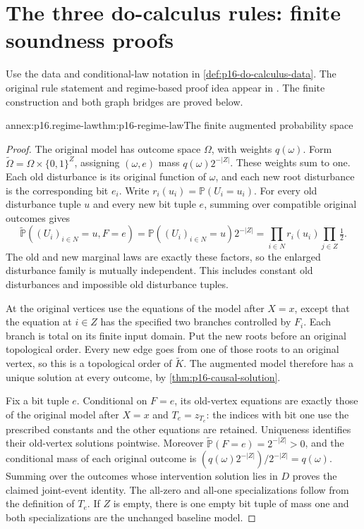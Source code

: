 \section{The three do-calculus rules: finite soundness proofs}
\label{sec:annex-p16-do-calculus-soundness}

Use the data and conditional-law notation in
\cref{def:p16-do-calculus-data}. The original rule statement and
regime-based proof idea appear in
\cite[Theorem~3 and Appendix, pp.~677, 686--687]{Pearl1995CausalDiagrams}.
The finite construction and both graph bridges are proved below.

\begin{annexitem}{annex:p16.regime-law}{thm:p16-regime-law}{The finite augmented probability space}
\begin{proof}
The original model has outcome space \(\Omega\), with weights
\(q(\omega)\). Form
\(\widetilde\Omega=\Omega\times\{0,1\}^Z\), assigning
\((\omega,e)\) mass \(q(\omega)2^{-|Z|}\). These weights sum
to one. Each old disturbance is its original function of \(\omega\),
and each new root disturbance is the corresponding bit \(e_i\).
Write \(r_i(u_i)=\mathbb P(U_i=u_i)\). For every old disturbance
tuple \(u\) and every new bit tuple \(e\), summing over compatible
original outcomes gives
\[
 \widetilde{\mathbb P}((U_i)_{i\in N}=u,F=e)
 =\mathbb P((U_i)_{i\in N}=u)2^{-|Z|}
 =\prod_{i\in N}r_i(u_i)\prod_{j\in Z}\tfrac12.
\]
The old and new marginal laws are exactly these factors, so the enlarged
disturbance family is mutually independent. This includes constant old
disturbances and impossible old disturbance tuples.

At the original vertices use the equations of the model after \(X=x\),
except that the equation at \(i\in Z\) has the specified two
branches controlled by \(F_i\). Each branch is total on its finite
input domain. Put the new roots before an original topological order.
Every new edge goes from one of those roots to an original vertex,
so this is a topological order of \(\widetilde K\). The augmented
model therefore has a unique solution at every outcome, by
\cref{thm:p16-causal-solution}.

Fix a bit tuple \(e\). Conditional on \(F=e\), its old-vertex
equations are exactly those of the original model after \(X=x\)
and \(T_e=z_{T_e}\): the indices with bit one use the prescribed
constants and the other equations are retained. Uniqueness identifies
their old-vertex solutions pointwise. Moreover
\(\widetilde{\mathbb P}(F=e)=2^{-|Z|}>0\), and the conditional
mass of each original outcome is
\((q(\omega)2^{-|Z|})/2^{-|Z|}=q(\omega)\).
Summing over the outcomes whose intervention solution lies in \(D\)
proves the claimed joint-event identity. The all-zero and all-one
specializations follow from the definition of \(T_e\). If \(Z\)
is empty, there is one empty bit tuple of mass one and both
specializations are the unchanged baseline model.
\end{proof}
\end{annexitem}

